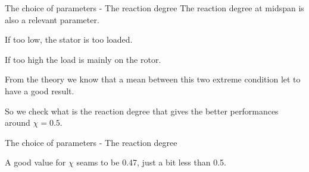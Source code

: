 \documentclass{beamer}
\newcommand{\myspaceneg}[0]{\vspace{-0.15cm}}
\begin{document}
\begin{frame}[t]{The choice of parameters - The reaction degree}
The reaction degree at midspan is also a relevant parameter. 
\begin{center}
If too low, the stator is too loaded.
\end{center}

\begin{center}
If too high the load is mainly on the rotor.
\end{center}

From the theory we know that a mean between this two extreme condition let to have a good result.

So we check what is the reaction degree that gives the better performances around $\chi = 0.5$.
\end{frame}

\begin{frame}[t]{The choice of parameters - The reaction degree}

\begin{center}
A good value for $\chi$ seams to be 0.47, just a bit less than 0.5.
\end{center}

\vspace{-1cm}
\begin{figure}
    \centering
\end{figure}


%

\end{frame}
\end{document}
